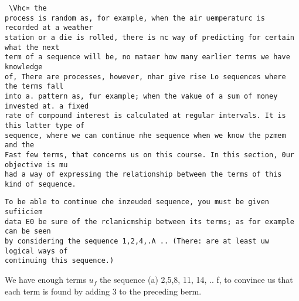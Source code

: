 \documentclass[]{article}
\begin{document}
\begin{verbatim}
 \Vhc¤ the
process is random as, for example, when the air uemperaturc is recorded at a weather
station or a die is rolled, there is nc way of predicting for certain what the next
term of a sequence will be, no mataer how many earlier terms we have knowledge
of, There are processes, however, nhar give rise Lo sequences where the terms fall
into a. pattern as, fur example; when the vakue of a sum of money invested at. a fixed
rate of compound interest is calculated at regular intervals. It is this latter type of
sequence, where we can continue nhe sequence when we know the pzmem and the
Fast few terms, that concerns us on this course. In this section, 0ur objective is mu
had a way of expressing the relationship between the terms of this kind of sequence.
\end{verbatim}
\begin{verbatim}
To be able to continue che inzeuded sequence, you must be given sufiiciem
data E0 be sure of the rclanicmship between its terms; as for example can be seen
by considering the sequence 1,2,4,.A .. (There: are at least uw logical ways of
continuing this sequence.)
\end{verbatim}

We have enough terms $u_f$ the sequence (a) 2,5,8, 11, 14, .. f, to convince us that
each term is found by adding 3 to the preceding berm. 
\end{document}
